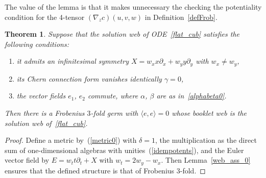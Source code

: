 \documentclass[11pt]{article}
\newtheorem{theorem}{Theorem}
\begin{document}
The value of the lemma is that it makes unnecessary the checking the potentiality condition for the 4-tensor $(\nabla_z c)(u,v,w)$ in Def\/inition~\ref{defFrob}.
\begin{theorem}\label{web_Frobenius_0}
Suppose that the solution web of ODE~\eqref{flat_cub} satisfies the following conditions:
\begin{enumerate}\itemsep=0pt
\item[$1)$] it admits an infinitesimal symmetry $X=w_xx\partial_x+w_yy\partial_y$ with $w_x\ne w_y$,
\item[$2)$] its Chern connection form vanishes identically $\gamma=0$,
\item[$3)$] the vector fields $e_1$, $e_2$ commute, where $\alpha$, $\beta$ are as in~\eqref{alphabeta0}.
\end{enumerate}
Then there is a Frobenius $3$-fold germ with $\langle e,e\rangle=0$
whose booklet web is the solution web of~\eqref{flat_cub}.
\end{theorem}
\begin{proof}
Def\/ine a metric by~(\ref{metric0}) with $\delta=1$,
the multiplication as the direct sum of one-dimensional algebras with unities~(\ref{idempotents}),
and the Euler vector f\/ield by $E=w_tt\partial_t+X$ with $w_t=2w_y-w_x$.
Then Lemma~\ref{web_ass_0} ensures that the def\/ined structure is that of Frobenius \mbox{$3$-fold}.
\end{proof}
\end{document}
